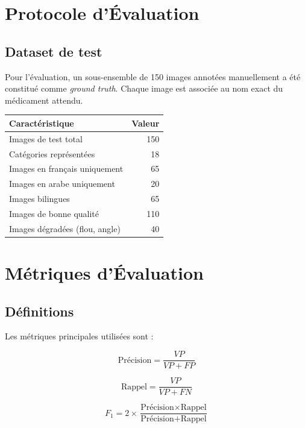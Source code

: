 \documentclass[12pt,a4paper]{report}
\newcommand{\en}[1]{\textit{\textit{#1}}}
\begin{document}
\section{Protocole d'\'Evaluation}

\subsection{Dataset de test}

Pour l'\'evaluation, un sous-ensemble de 150 images annot\'ees manuellement a \'et\'e constitu\'e comme \en{ground truth}. Chaque image est associ\'ee au nom exact du m\'edicament attendu.

\begin{center}
\begin{tabular}{lr}
\toprule
\textbf{Caract\'eristique} & \textbf{Valeur} \\
\midrule
Images de test total & 150 \\
Cat\'egories repr\'esent\'ees & 18 \\
Images en fran\c{c}ais uniquement & 65 \\
Images en arabe uniquement & 20 \\
Images bilingues & 65 \\
Images de bonne qualit\'e & 110 \\
Images d\'egrad\'ees (flou, angle) & 40 \\
\bottomrule
\end{tabular}
\end{center}

\section{M\'etriques d'\'Evaluation}

\subsection{D\'efinitions}

Les m\'etriques principales utilis\'ees sont :

\begin{equation}
\text{Pr\'ecision} = \frac{VP}{VP + FP}
\end{equation}

\begin{equation}
\text{Rappel} = \frac{VP}{VP + FN}
\end{equation}

\begin{equation}
F_1 = 2 \times \frac{\text{Pr\'ecision} \times \text{Rappel}}{\text{Pr\'ecision} + \text{Rappel}}
\end{equation}
\end{document}
